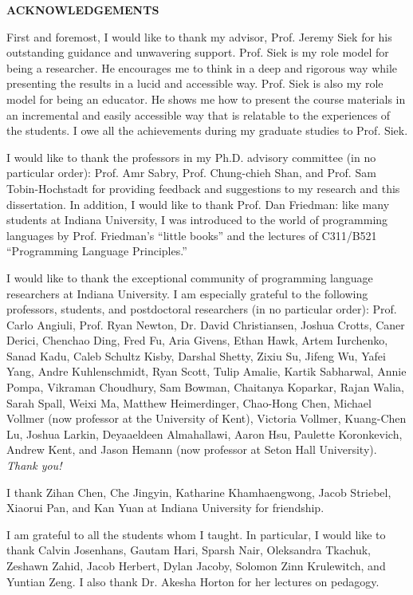 \begin{centering}
\textbf{ACKNOWLEDGEMENTS}\\
\vspace{\baselineskip}
\end{centering}

First and foremost, I would like to thank my advisor, Prof. Jeremy Siek for his
outstanding guidance and unwavering support. Prof. Siek is my role model for
being a researcher. He encourages me to think in a deep and rigorous way while
presenting the results in a lucid and accessible way. Prof. Siek is also my role
model for being an educator. He shows me how to present the course materials in
an incremental and easily accessible way that is relatable to the experiences of
the students. I owe all the achievements during my graduate studies to Prof.
Siek.

I would like to thank the professors in my Ph.D. advisory committee (in no
particular order): Prof. Amr Sabry, Prof. Chung-chieh Shan, and Prof. Sam
Tobin-Hochstadt for providing feedback and suggestions to my research and this
dissertation. In addition, I would like to thank Prof. Dan Friedman: like many
students at Indiana University, I was introduced to the world of programming
languages by Prof. Friedman's ``little books'' and the lectures of C311/B521
``Programming Language Principles.''

I would like to thank the exceptional community of programming language
researchers at Indiana University. I am especially grateful to the following
professors, students, and postdoctoral researchers (in no particular order):
Prof. Carlo Angiuli, Prof. Ryan Newton, Dr. David Christiansen, Joshua Crotts,
Caner Derici, Chenchao Ding, Fred Fu, Aria Givens, Ethan Hawk, Artem Iurchenko,
Sanad Kadu, Caleb Schultz Kisby, Darshal Shetty, Zixiu Su, Jifeng Wu, Yafei
Yang, Andre Kuhlenschmidt, Ryan Scott, Tulip Amalie, Kartik Sabharwal, Annie
Pompa, Vikraman Choudhury, Sam Bowman, Chaitanya Koparkar, Rajan Walia, Sarah
Spall, Weixi Ma, Matthew Heimerdinger, Chao-Hong Chen, Michael Vollmer (now
professor at the University of Kent), Victoria Vollmer, Kuang-Chen Lu, Joshua
Larkin, Deyaaeldeen Almahallawi, Aaron Hsu, Paulette Koronkevich, Andrew Kent,
and Jason Hemann (now professor at Seton Hall University). \textit{Thank you!}

I thank Zihan Chen, Che Jingyin, Katharine Khamhaengwong, Jacob Striebel,
Xiaorui Pan, and Kan Yuan at Indiana University for friendship.

I am grateful to all the students whom I taught. In particular, I would like to
thank Calvin Josenhans, Gautam Hari, Sparsh Nair, Oleksandra Tkachuk, Zeshawn
Zahid, Jacob Herbert, Dylan Jacoby, Solomon Zinn Krulewitch, and Yuntian Zeng. I
also thank Dr. Akesha Horton for her lectures on pedagogy.

